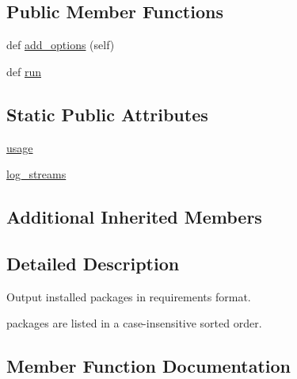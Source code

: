 \subsection*{Public Member Functions}
\begin{DoxyCompactItemize}
\item 
def \hyperlink{classpip_1_1__internal_1_1commands_1_1freeze_1_1FreezeCommand_a7fa523c53d740a5a524e890f6f5f9315}{add\+\_\+options} (self)
\item 
def \hyperlink{classpip_1_1__internal_1_1commands_1_1freeze_1_1FreezeCommand_ac152533a44afe339ceb22108d57b5d5a}{run}
\end{DoxyCompactItemize}
\subsection*{Static Public Attributes}
\begin{DoxyCompactItemize}
\item 
\hyperlink{classpip_1_1__internal_1_1commands_1_1freeze_1_1FreezeCommand_a859d893933fec25904dd18c8d63ce82c}{usage}
\item 
\hyperlink{classpip_1_1__internal_1_1commands_1_1freeze_1_1FreezeCommand_a92bc724124f4baf5e76030a119deeb6c}{log\+\_\+streams}
\end{DoxyCompactItemize}
\subsection*{Additional Inherited Members}


\subsection{Detailed Description}
\begin{DoxyVerb}Output installed packages in requirements format.

packages are listed in a case-insensitive sorted order.
\end{DoxyVerb}
 

\subsection{Member Function Documentation}
\mbox{\label{classpip_1_1__internal_1_1commands_1_1freeze_1_1FreezeCommand_a7fa523c53d740a5a524e890f6f5f9315}} 
